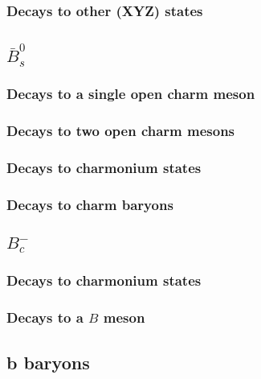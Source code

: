 \subsubsection{Decays to other (XYZ) states}


\subsection{$\bar{B}_s^0$}

\subsubsection{Decays to a single open charm meson}

\subsubsection{Decays to two open charm mesons}

\subsubsection{Decays to charmonium states}

\subsubsection{Decays to charm baryons}


\subsection{$B_c^-$}

\subsubsection{Decays to charmonium states}

\subsubsection{Decays to a $B$ meson}


\subsection{b baryons}

